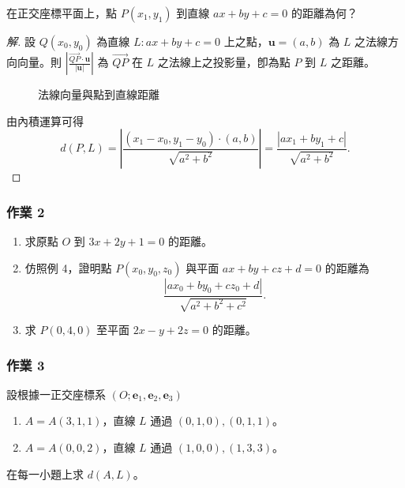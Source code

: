 \begin{example}[例 4]
在正交座標平面上，點 $P(x_1, y_1)$ 到直線 $ax + by + c = 0$ 的距離為何？
\end{example}
\begin{proof}[解]
設 $Q(x_0, y_0)$ 為直線 $L : ax + by + c = 0$ 上之點，$\mathbf{u} = (a, b)$ 為 $L$ 之法線方向向量。則
$\left| \frac{\vec{QP} \cdot \mathbf{u}}{|\mathbf{u}|} \right|$ 為 $\vec{QP}$ 在 $L$ 之法線上之投影量，卽為點 $P$ 到 $L$ 之距離。

\begin{figure}[H]
\centering
{}
\caption{法線向量與點到直線距離}
\label{fig:5-11}
\end{figure}

由內積運算可得
\[ d(P, L) = \left| \frac{(x_1 - x_0, y_1 - y_0) \cdot (a, b)}{\sqrt{a^2 + b^2}} \right| = \frac{|ax_1 + by_1 + c|}{\sqrt{a^2 + b^2}}. \]
\end{proof}

\subsubsection*{作業 2}
\begin{enumerate}[label=(\roman*), leftmargin=2.5em]
  \item 求原點 $O$ 到 $3x + 2y + 1 = 0$ 的距離。
  \item 仿照例 4，證明點 $P(x_0, y_0, z_0)$ 與平面 $ax + by + cz + d = 0$ 的距離為
  \[ \frac{|ax_0 + by_0 + cz_0 + d|}{\sqrt{a^2 + b^2 + c^2}}. \]
  \item 求 $P(0, 4, 0)$ 至平面 $2x - y + 2z = 0$ 的距離。
\end{enumerate}

\subsubsection*{作業 3}
設根據一正交座標系 $(O; \mathbf{e}_1, \mathbf{e}_2, \mathbf{e}_3)$
\begin{enumerate}[label=(\roman*), leftmargin=2.5em]
  \item $A = A(3, 1, 1)$，直線 $L$ 通過 $(0, 1, 0), (0, 1, 1)$。
  \item $A = A(0, 0, 2)$，直線 $L$ 通過 $(1, 0, 0), (1, 3, 3)$。
\end{enumerate}
在每一小題上求 $d(A, L)$。

